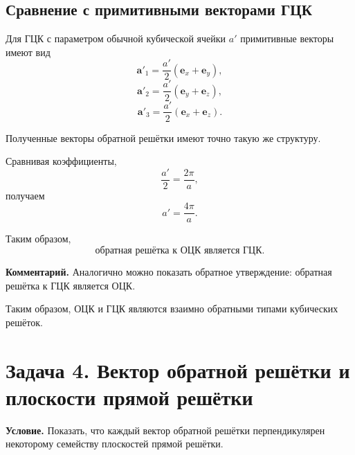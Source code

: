 \documentclass[../final.tex]{subfiles}
\begin{document}
\subsection*{Сравнение с примитивными векторами ГЦК}

Для ГЦК с параметром обычной кубической ячейки $a'$
примитивные векторы имеют вид
%
\begin{equation*}
    \mathbf a'_1
    =
    \frac{a'}{2}
    (\mathbf e_x+\mathbf e_y),
\end{equation*}
%
\begin{equation*}
    \mathbf a'_2
    =
    \frac{a'}{2}
    (\mathbf e_y+\mathbf e_z),
\end{equation*}
%
\begin{equation*}
    \mathbf a'_3
    =
    \frac{a'}{2}
    (\mathbf e_x+\mathbf e_z).
\end{equation*}

Полученные векторы обратной решётки имеют точно такую же
структуру.

Сравнивая коэффициенты,
%
\begin{equation*}
    \frac{a'}{2}
    =
    \frac{2\pi}{a},
\end{equation*}
%
получаем
%
\begin{equation*}
    \boxed{
        a'
        =
        \frac{4\pi}{a}
    }.
\end{equation*}

Таким образом,
%
\begin{equation*}
    \boxed{
        \text{обратная решётка к ОЦК является ГЦК.}
    }
\end{equation*}

\textbf{Комментарий.}
Аналогично можно показать обратное утверждение:
обратная решётка к ГЦК является ОЦК.

Таким образом, ОЦК и ГЦК являются взаимно обратными
типами кубических решёток.



\section{Задача 4. Вектор обратной решётки и плоскости прямой решётки}

\textbf{Условие.}
Показать, что каждый вектор обратной решётки перпендикулярен
некоторому семейству плоскостей прямой решётки.


%
%
\end{document}
